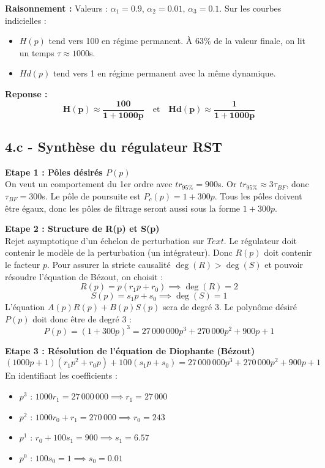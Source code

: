 \documentclass[11pt,a4paper]{article}
\begin{document}
\textbf{Raisonnement :} Valeurs : $\alpha_1=0.9$, $\alpha_2=0.01$, $\alpha_3=0.1$.
Sur les courbes indicielles :
\begin{itemize}
    \item $H(p)$ tend vers 100 en régime permanent. À $63\%$ de la valeur finale, on lit un temps $\tau \approx 1000$s.
    \item $Hd(p)$ tend vers 1 en régime permanent avec la même dynamique.
\end{itemize}

\textbf{Reponse :}
$$ 
\mathbf{H(p) \approx \frac{100}{1 + 1000p}} \quad \text{et} \quad \mathbf{Hd(p) \approx \frac{1}{1 + 1000p}} 
$$

\subsection*{4.c - Synthèse du régulateur RST}

\textbf{Etape 1 : Pôles désirés $P(p)$}\\
On veut un comportement du 1er ordre avec $tr_{95\%} = 900$s.
Or $tr_{95\%} \approx 3\tau_{BF}$, donc $\tau_{BF} = 300$s. Le pôle de poursuite est $P_c(p) = 1 + 300p$.
Tous les pôles doivent être égaux, donc les pôles de filtrage seront aussi sous la forme $1 + 300p$.

\textbf{Etape 2 : Structure de R(p) et S(p)}\\
Rejet asymptotique d'un échelon de perturbation sur $Text$.
Le régulateur doit contenir le modèle de la perturbation (un intégrateur). Donc $R(p)$ doit contenir le facteur $p$.
Pour assurer la stricte causalité $\deg(R) > \deg(S)$ et pouvoir résoudre l'équation de Bézout, on choisit :
$$ R(p) = p(r_1 p + r_0) \implies \deg(R)=2 $$
$$ S(p) = s_1 p + s_0 \implies \deg(S)=1 $$
L'équation $A(p)R(p) + B(p)S(p)$ sera de degré 3. Le polynôme désiré $P(p)$ doit donc être de degré 3 :
$$ P(p) = (1 + 300p)^3 = 27\,000\,000 p^3 + 270\,000 p^2 + 900 p + 1 $$

\textbf{Etape 3 : Résolution de l'équation de Diophante (Bézout)}\\
$$ (1000p + 1)(r_1 p^2 + r_0 p) + 100(s_1 p + s_0) = 27\,000\,000 p^3 + 270\,000 p^2 + 900 p + 1 $$
En identifiant les coefficients :
\begin{itemize}
    \item $p^3$ : $1000 r_1 = 27\,000\,000 \implies r_1 = 27\,000$
    \item $p^2$ : $1000 r_0 + r_1 = 270\,000 \implies r_0 = 243$
    \item $p^1$ : $r_0 + 100 s_1 = 900 \implies s_1 = 6.57$
    \item $p^0$ : $100 s_0 = 1 \implies s_0 = 0.01$
\end{itemize}
\end{document}
